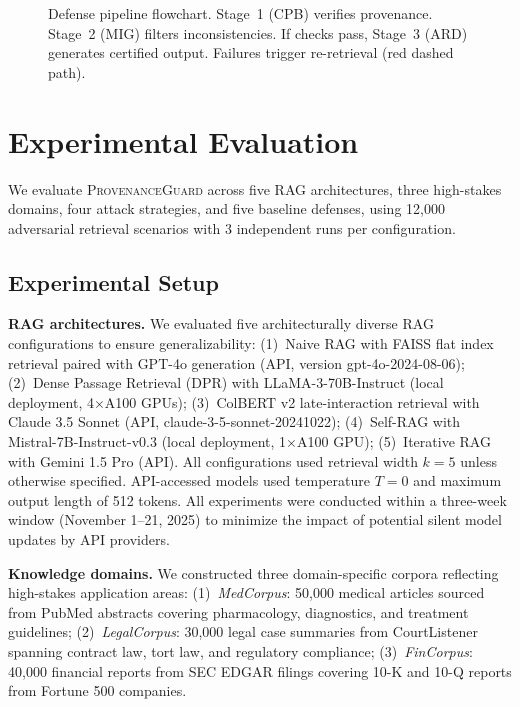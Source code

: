 \documentclass[journal,10pt]{IEEEtran}
\begin{document}
\begin{figure}[t]
\caption{Defense pipeline flowchart. Stage~1 (CPB) verifies provenance. Stage~2 (MIG) filters inconsistencies. If checks pass, Stage~3 (ARD) generates certified output. Failures trigger re-retrieval (red dashed path).}
\label{fig:flowchart}
\end{figure}

\section{Experimental Evaluation}\label{sec:experiments}
We evaluate \textsc{ProvenanceGuard} across five RAG architectures, three high-stakes domains, four attack strategies, and five baseline defenses, using 12{,}000 adversarial retrieval scenarios with 3 independent runs per configuration.

\subsection{Experimental Setup}

\textbf{RAG architectures.} We evaluated five architecturally diverse RAG configurations to ensure generalizability: (1)~Naive RAG with FAISS flat index retrieval paired with GPT-4o generation (API, version gpt-4o-2024-08-06); (2)~Dense Passage Retrieval (DPR) with LLaMA-3-70B-Instruct (local deployment, 4$\times$A100 GPUs); (3)~ColBERT v2 late-interaction retrieval with Claude 3.5 Sonnet (API, claude-3-5-sonnet-20241022); (4)~Self-RAG with Mistral-7B-Instruct-v0.3 (local deployment, 1$\times$A100 GPU); (5)~Iterative RAG with Gemini 1.5 Pro (API). All configurations used retrieval width $k = 5$ unless otherwise specified. API-accessed models used temperature $T = 0$ and maximum output length of 512 tokens. All experiments were conducted within a three-week window (November 1--21, 2025) to minimize the impact of potential silent model updates by API providers.

\textbf{Knowledge domains.} We constructed three domain-specific corpora reflecting high-stakes application areas: (1)~\emph{MedCorpus}: 50{,}000 medical articles sourced from PubMed abstracts covering pharmacology, diagnostics, and treatment guidelines; (2)~\emph{LegalCorpus}: 30{,}000 legal case summaries from CourtListener spanning contract law, tort law, and regulatory compliance; (3)~\emph{FinCorpus}: 40{,}000 financial reports from SEC EDGAR filings covering 10-K and 10-Q reports from Fortune 500 companies.
\end{document}
